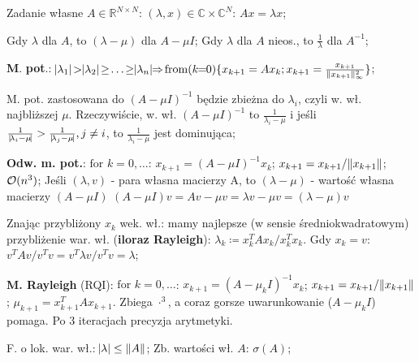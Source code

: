 
\entry
Zadanie własne $A \in \mathbb{R}^{N \times N}$:
$(\lambda,x) \in \mathbb{C} \times \mathbb{C}^N$:
$Ax = \lambda x$;

\entry
Gdy $\lambda$ dla $A$, to $(\lambda - \mu)$ dla $A-\mu I$;
\entry
Gdy $\lambda$ dla $A$ nieos., to $\frac{1}{\lambda}$ dla $A^{-1}$;

\entry
\textbf{M}. \textbf{pot}.:
$\abs{\lambda_1} \!>\! \abs{\lambda_2} \!\geq\! \ldots \!\geq\! \abs{\lambda_n}
\!\!\Rightarrow\!
\fromloop{k}\{x_{k+1}=Ax_k; \normifyfrac[\infty][2]{x_{k+1}}\}$;

\entry
M. pot. zastosowana do
$(A-\mu I)^{-1}$
będzie zbieżna do
$\lambda_i$,
czyli w. wł. najbliższej $\mu$.
Rzeczywiście, w. wł.
$(A-\mu I)^{-1}$
to
$\frac{1}{\lambda_i-\mu}$
i jeśli
$\frac{1}{\mid\! \lambda_i-\mu\! \mid} > \frac{1}{\mid\! \lambda_j-\mu\! \mid}, j\neq i$,
to
$\frac{1}{\lambda_i-\mu}$
jest dominująca;

\entry
\textbf{Odw. m. pot.}:
$\text{for } k=0,\ldots$:
$x_{k+1} = (A-\mu I)^{-1}x_k$;
$x_{k+1} = x_{k+1} / \|x_{k+1}\|$;
$\mathcal{O}(n^3)$;
\entry
Jeśli $(\lambda, v)$ - para własna macierzy A, to $(\lambda - \mu)$ - wartość własna macierzy $(A - \mu I)$
	\((A - \mu I)v = Av - \mu v = \lambda v - \mu v = (\lambda - \mu)v\)
\entry

\entry
Znając przybliżony $x_k$ wek. wł.: mamy najlepsze (w sensie
średniokwadratowym) przybliżenie war. wł. (\textbf{iloraz Rayleigh}):
$\lambda_k \coloneqq x_k^T A x_k / x_k^T x_k$.
Gdy $x_k = v$:
$v^T A v / v^T v = v^T \lambda v / v^T v = \lambda$;

\entry
\textbf{M. Rayleigh} (RQI):
$\text{for } k=0,\ldots$:
$x_{k+1} = (A - \mu_k I)^{-1} x_k$;
$x_{k+1} = x_{k+1} / \|x_{k+1}\|$;
$\mu_{k+1} = x_{k+1}^T A x_{k+1}$.
Zbiega $\cdot^3$, a coraz gorsze uwarunkowanie ($A-\mu_k I$) pomaga.
Po $3$ iteracjach precyzja arytmetyki.


\entry
F. o lok. war. wł.:
$\abs{\lambda} \leq \|A\|$;
\entry
Zb. wartości wł. $A$:
$\sigma(A)$;

